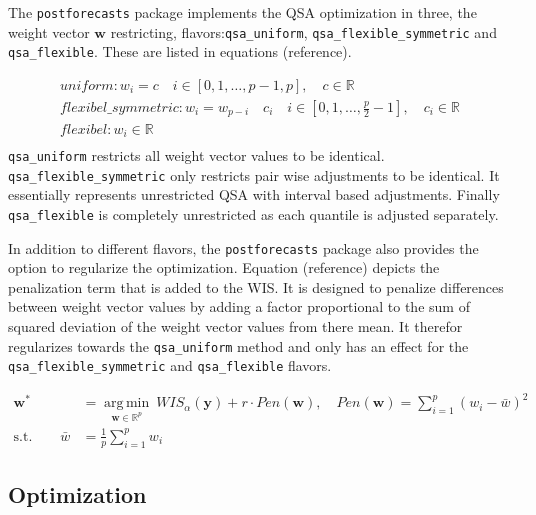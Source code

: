 \documentclass[
]{article}
\begin{document}
The \texttt{postforecasts} package implements the QSA optimization in three, the weight vector \(\mathbf{w}\) restricting, flavors:\texttt{qsa\_uniform}, \texttt{qsa\_flexible\_symmetric} and \texttt{qsa\_flexible}. These are listed in equations (reference).

\[
\begin{aligned}
uniform: w_i = c \quad i \in [0, 1, \ldots, p-1, p], \quad c \in \mathbb{R} \\
flexibel\_symmetric: w_i = w_{p-i} \quad c_{i} \quad i \in [0, 1, \ldots, \frac{p}{2}-1], \quad c_{i} \in \mathbb{R} \\
flexibel: w_i \in \mathbb{R} \\
\end{aligned}
\]
\texttt{qsa\_uniform} restricts all weight vector values to be identical. \texttt{qsa\_flexible\_symmetric} only restricts pair wise adjustments to be identical. It essentially represents unrestricted QSA with interval based adjustments. Finally \texttt{qsa\_flexible} is completely unrestricted as each quantile is adjusted separately.

In addition to different flavors, the \texttt{postforecasts} package also provides the option to regularize the optimization. Equation (reference) depicts the penalization term that is added to the WIS. It is designed to penalize differences between weight vector values by adding a factor proportional to the sum of squared deviation of the weight vector values from there mean. It therefor regularizes towards the \texttt{qsa\_uniform} method and only has an effect for the \texttt{qsa\_flexible\_symmetric} and \texttt{qsa\_flexible} flavors.

\[
\begin{aligned}
\mathbf{w}^*
&= \operatorname*{arg\,min}_{\mathbf{w} \in \mathbb{R}^p} \ WIS_\alpha(\mathbf{y}) + r \cdot Pen(\mathbf{w}), \quad Pen(\mathbf{w}) = \sum_{i=1}^p (w_i - \bar{w})^2 \\
\text{s.t.} \qquad \bar{w} &= \frac{1}{p} \sum_{i=1}^p w_i
\end{aligned}
\]

\hypertarget{optimization}{%
\subsection{Optimization}\label{optimization}}
\end{document}
